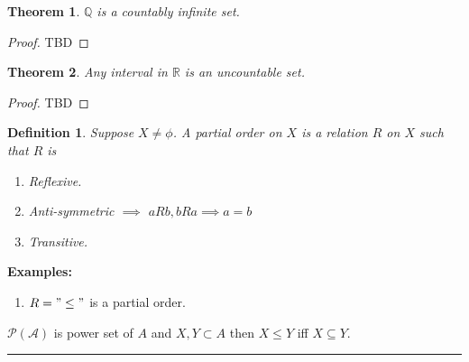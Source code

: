 \documentclass[12pt]{report}
\newtheorem{thm}{Theorem}
\newtheorem{defn}{Definition}
\begin{document}
\begin{thm}
    $\mathbb{Q}$ is a countably infinite set.
\end{thm}
\begin{proof}
    TBD
\end{proof}
\begin{thm}
    Any interval in $\mathbb{R}$ is an uncountable set.
\end{thm}
\begin{proof}
    TBD
\end{proof}
\begin{defn}
    Suppose $X \neq \phi$. A partial order on $X$ is a relation $R$ on $X$ such that $R$ is
    \begin{enumerate}
        \item Reflexive.
        \item Anti-symmetric $\implies$ $aRb, bRa \implies a=b$
        \item Transitive.
    \end{enumerate} 
\end{defn}
\textbf{Examples:}
\begin{enumerate}
    \item $R = "\leq"$ is a partial order.
\end{enumerate}
$\mathcal{P(A)}$ is power set of $A$ and $X,Y \subset A$ then $X \leq Y$ iff $X \subseteq Y$.
\hrule
\end{document}
